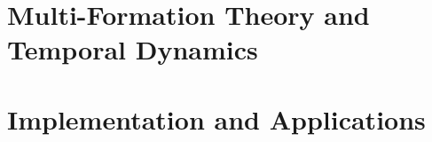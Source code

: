 \documentclass{SNmono}
\begin{document}
\part{Multi-Formation Theory and Temporal Dynamics}
\label{part:multi-temporal}





\part{Implementation and Applications}
\label{part:implementation}







\appendix












\printindex

\end{document}
